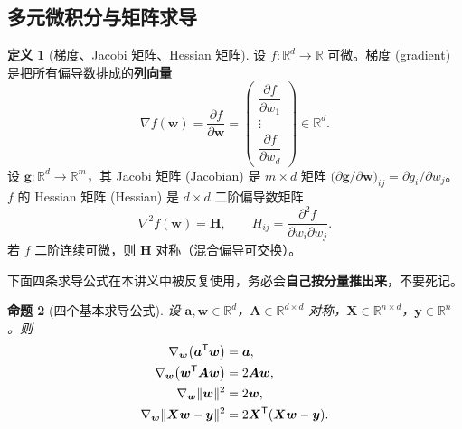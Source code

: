 \documentclass[UTF8,a4paper,11pt]{ctexart}
\theoremstyle{definition}
\newtheorem{definition}{定义}[section]
\theoremstyle{plain}
\newtheorem{proposition}[definition]{命题}
\theoremstyle{remark}
\DeclarePairedDelimiter{\norm}{\lVert}{\rVert}
\newcommand{\R}{\mathbb{R}}
\newcommand{\T}{^{\mathsf{T}}}
\newcommand{\eng}[1]{\textup{(#1)}}
\begin{document}
\subsection{多元微积分与矩阵求导}

\begin{definition}[梯度、Jacobi 矩阵、Hessian 矩阵]
设 $f:\R^d\to\R$ 可微。梯度 \eng{gradient} 是把所有偏导数排成的\textbf{列向量}
\[
  \nabla f(\bm{w})=\frac{\partial f}{\partial\bm{w}}
  =\begin{pmatrix}\dfrac{\partial f}{\partial w_1}\\[4pt]\vdots\\[4pt]\dfrac{\partial f}{\partial w_d}\end{pmatrix}\in\R^{d}.
\]
设 $\bm{g}:\R^d\to\R^m$，其 Jacobi 矩阵 \eng{Jacobian} 是 $m\times d$ 矩阵 $\big(\partial\bm{g}/\partial\bm{w}\big)_{ij}=\partial g_i/\partial w_j$。
$f$ 的 Hessian 矩阵 \eng{Hessian} 是 $d\times d$ 二阶偏导数矩阵
\[
  \nabla^2f(\bm{w})=\bm{H},\qquad H_{ij}=\frac{\partial^2f}{\partial w_i\partial w_j}.
\]
若 $f$ 二阶连续可微，则 $\bm{H}$ 对称（混合偏导可交换）。
\end{definition}

下面四条求导公式在本讲义中被反复使用，务必会\textbf{自己按分量推出来}，不要死记。

\begin{proposition}[四个基本求导公式]\label{prop:matcalc}
设 $\bm{a},\bm{w}\in\R^d$，$\bm{A}\in\R^{d\times d}$ 对称，$\bm{X}\in\R^{n\times d}$，$\bm{y}\in\R^n$。则
\begin{align}
  \nabla_{\bm{w}}\big(\bm{a}\T\bm{w}\big)&=\bm{a}, \label{eq:mc1}\\
  \nabla_{\bm{w}}\big(\bm{w}\T\bm{A}\bm{w}\big)&=2\bm{A}\bm{w}, \label{eq:mc2}\\
  \nabla_{\bm{w}}\norm{\bm{w}}^2&=2\bm{w}, \label{eq:mc3}\\
  \nabla_{\bm{w}}\norm{\bm{X}\bm{w}-\bm{y}}^2&=2\bm{X}\T(\bm{X}\bm{w}-\bm{y}). \label{eq:mc4}
\end{align}
\end{proposition}
\end{document}

